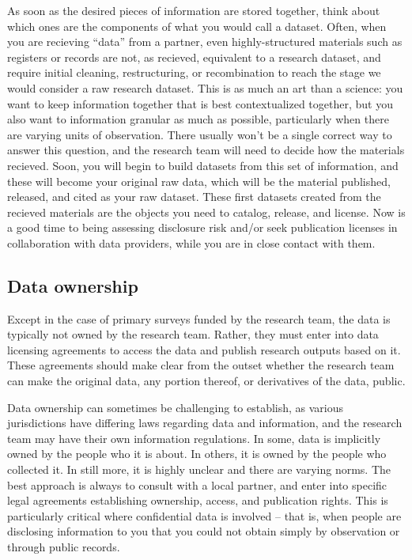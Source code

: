 As soon as the desired pieces of information are stored together,
think about which ones are the components of what you would call a dataset.
Often, when you are recieving ``data'' from a partner,
even highly-structured materials such as registers or records
are not, as recieved, equivalent to a research dataset,
and require initial cleaning, restructuring, or recombination
to reach the stage we would consider a raw research dataset.
This is as much an art than a science:
you want to keep information together that is best contextualized together,
but you also want to information granular as much as possible,
particularly when there are varying units of observation.
There usually won't be a single correct way to answer this question,
and the research team will need to decide how the materials recieved.
Soon, you will begin to build datasets from this set of information,
and these will become your original raw data,
which will be the material published, released, and cited as your raw dataset.
These first datasets created from the recieved materials
are the objects you need to catalog, release, and license.
Now is a good time to being assessing disclosure risk
and/or seek publication licenses in collaboration with data providers,
while you are in close contact with them.

\subsection{Data ownership}
Except in the case of primary surveys funded by the research team,
the data is typically not owned by the research team.
Rather, they must enter into data licensing agreements
to access the data and publish research outputs based on it.
These agreements should make clear from the outset whether the
research team can make the original data, any portion thereof, or derivatives
of the data, public.

Data ownership can sometimes be challenging to establish,
as various jurisdictions have differing laws regarding data and information,
and the research team may have their own information regulations.
In some, data is implicitly owned by the people who it is about.
In others, it is owned by the people who collected it.
In still more, it is highly unclear and there are varying norms.
The best approach is always to consult with a local partner,
and enter into specific legal agreements establishing ownership,
access, and publication rights.
This is particularly critical where confidential data is involved
-- that is, when people are disclosing information to you
that you could not obtain simply by observation or through public records.

